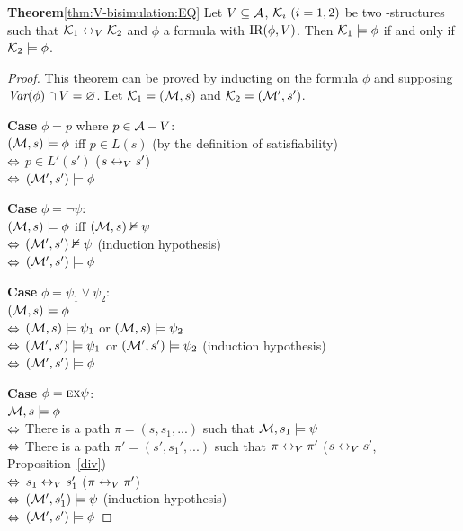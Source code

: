 \documentclass{article}
\begin{document}
\noindent\textbf{Theorem}\ref{thm:V-bisimulation:EQ}
Let $V\subseteq\cal A$, ${\cal K}_i~(i=1,2)$ be two \MPK-structures such that
  ${\cal K}_1\leftrightarrow_V{\cal K}_2$ and $\phi$ a formula with $\textrm{IR}(\phi,V)$. Then
  ${\cal K}_1\models\phi$ if and only if ${\cal K}_2\models\phi$.
\begin{proof}
This theorem can be proved by inducting on the formula $\phi$ and supposing $\textit{Var}(\phi) \cap V = \varnothing$.
Let ${\cal K}_1 = ({\cal M}, s)$ and ${\cal K}_2 = ({\cal M}', s')$.


\textbf{Case} $\phi = p$ where $p \in {\cal A} - V$:\\
$({\cal M}, s) \models \phi$ iff $p\in L(s)$  \hfill  (by the definition of satisfiability) \\
$\Leftrightarrow$ $p \in L'(s')$ \hfill ($s \leftrightarrow_V s'$)\\
$\Leftrightarrow$ $({\cal M}', s') \models \phi$

\textbf{Case} $\phi = \neg \psi$:\\
$({\cal M}, s) \models \phi$ iff $({\cal M}, s) \nvDash \psi$ \\
$\Leftrightarrow$ $({\cal M}', s') \nvDash \psi$  \hfill   (induction hypothesis)\\
$\Leftrightarrow$ $({\cal M}', s') \models \phi$

\textbf{Case} $\phi = \psi_1 \vee \psi_2$:\\
$({\cal M}, s) \models \phi$\\
$\Leftrightarrow$ $({\cal M}, s) \models \psi_1$ or $({\cal M}, s) \models \psi_2$\\
$\Leftrightarrow$ $({\cal M}', s') \models \psi_1$ or $({\cal M}', s') \models \psi_2$   \hfill  (induction hypothesis)\\
$\Leftrightarrow$ $({\cal M}', s') \models \phi$

\textbf{Case} $\phi = \textsc{e} \textsc{x} \psi$:\\
${\cal M}, s \models \phi$ \\
$\Leftrightarrow$ There is a path $\pi = (s, s_1, ...)$ such that ${\cal M}, s_1 \models \psi$\\
$\Leftrightarrow$ There is a path $\pi' = (s', s_1', ...)$ such that $\pi \leftrightarrow_V \pi'$ \hfill   ($s \leftrightarrow_V s'$, Proposition~\ref{div})\\
$\Leftrightarrow$ $s_1 \leftrightarrow_V s_1'$  \hfill ($\pi \leftrightarrow_V \pi'$)\\
$\Leftrightarrow$ $({\cal M}', s_1') \models \psi$  \hfill  (induction hypothesis)\\
$\Leftrightarrow$ $({\cal M}', s') \models \phi$


\end{proof}
\end{document}

